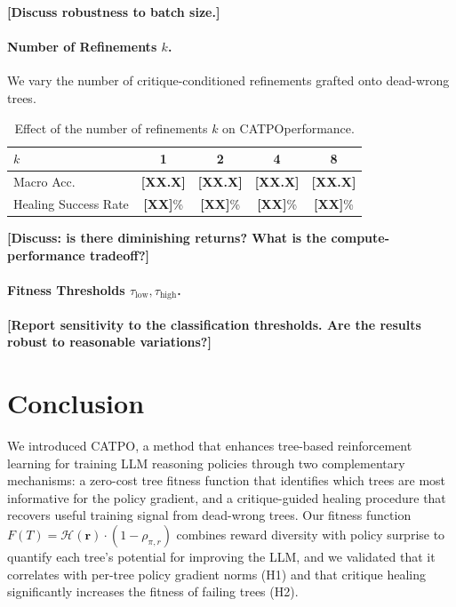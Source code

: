 \documentclass{article} %
\newcommand{\CATPO}{\textsc{CATPO}}
\newcommand{\placeholder}[1]{{\color{red}\textbf{[#1]}}}
\begin{document}
\placeholder{Discuss robustness to batch size.}

\paragraph{Number of Refinements $k$.} We vary the number of critique-conditioned refinements grafted onto dead-wrong trees.

\begin{table}[h]
    \centering
    \begin{tabular}{l|cccc}
    \toprule
    $k$ & 1 & 2 & 4 & 8 \\
    \midrule
    Macro Acc. & \placeholder{XX.X} & \placeholder{XX.X} & \placeholder{XX.X} & \placeholder{XX.X} \\
    Healing Success Rate & \placeholder{XX}\% & \placeholder{XX}\% & \placeholder{XX}\% & \placeholder{XX}\% \\
    \bottomrule
    \end{tabular}
    \caption{Effect of the number of refinements $k$ on \CATPO performance.}
    \label{tab:k_ablation}
\end{table}

\placeholder{Discuss: is there diminishing returns? What is the compute-performance tradeoff?}

\paragraph{Fitness Thresholds $\tau_\text{low}, \tau_\text{high}$.} \placeholder{Report sensitivity to the classification thresholds. Are the results robust to reasonable variations?}


\section{Conclusion}
\label{sec:conclusion}

We introduced \CATPO, a method that enhances tree-based reinforcement learning for training LLM reasoning policies through two complementary mechanisms: a zero-cost tree fitness function that identifies which trees are most informative for the policy gradient, and a critique-guided healing procedure that recovers useful training signal from dead-wrong trees. Our fitness function $F(T) = \mathcal{H}(\mathbf{r}) \cdot (1 - \rho_{\pi,r})$ combines reward diversity with policy surprise to quantify each tree's potential for improving the LLM, and we validated that it correlates with per-tree policy gradient norms (H1) and that critique healing significantly increases the fitness of failing trees (H2).
\end{document}
